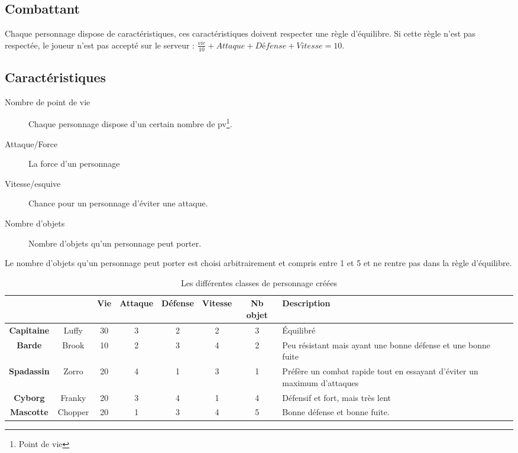 \documentclass[12pt,a4paper,openany]{book}
\begin{document}
	\subsection{Combattant}
	Chaque personnage dispose de caractéristiques, ces caractéristiques doivent respecter une règle d'équilibre. Si cette règle n'est pas respectée, le joueur
	n'est pas accepté sur le serveur : $\frac{vie}{10} + Attaque + Défense + Vitesse = 10$.
	\subsection{Caractéristiques}
	\begin{description}
		\item[Nombre de point de vie] Chaque personnage dispose d’un certain nombre de pv\footnote{Point de vie}.
		\item[Attaque/Force] La force d'un personnage 
		\item[Vitesse/esquive] Chance pour un personnage d’éviter une attaque.
		\item[Nombre d'objets] Nombre d’objets qu'un personnage peut porter.
	\end{description}

Le nombre d'objets qu'un personnage peut porter est choisi arbitrairement et compris entre 1 et 5 et ne rentre pas dans la règle d'équilibre.

	 \begin{table}[H]
		 \centering
		 \normalsize
	 \begin{tabular}{cc|cccccp{5.0cm}}
			&&Vie& Attaque & Défense & Vitesse & Nb objet&Description\\
			\hline
			\textbf{Capitaine} & Luffy & 30 & 3 & 2 & 2 & 3& \footnotesize Équilibré\\
			\hline
			\textbf{Barde} & Brook & 10 & 2 & 3 & 4 & 2& \footnotesize Peu résistant mais ayant une bonne défense et une bonne fuite\\
			\hline
			\textbf{Spadassin} & Zorro & 20 & 4 & 1& 3&1& \footnotesize Préfère un combat rapide tout en essayant d'éviter un maximum d'attaques\\
			\hline
			\textbf{Cyborg} & Franky & 20 & 3 & 4 & 1& 4 & \footnotesize Défensif et fort, mais très lent\\
			\hline
			\textbf{Mascotte} & Chopper&20&1&3&4&5& \footnotesize Bonne défense et bonne fuite. \\
			\hline
		\end{tabular}
		\caption{Les différentes classes de personnage créées}
	\end{table}
\end{document}
